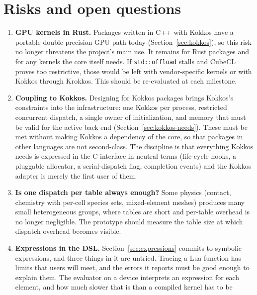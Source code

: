 \documentclass[11pt,a4paper]{article}
\newcommand{\code}[1]{\texttt{#1}}
\begin{document}
\section{Risks and open questions}
\label{sec:risks}

\begin{enumerate}
  \item \label{risk:gpu} \textbf{GPU kernels in Rust.}  Packages written in C++ with Kokkos
        have a portable double-precision GPU path today
        (Section~\ref{sec:kokkos}), so this risk no longer threatens the
        project's main use.  It remains for Rust packages and for any kernels
        the core itself needs.  If \code{std::offload} stalls and CubeCL
        proves too restrictive, those would be left with vendor-specific
        kernels or with Kokkos through Krokkos.  This should be re-evaluated
        at each milestone.
  \item \textbf{Coupling to Kokkos.}  Designing for Kokkos packages brings
        Kokkos's constraints into the infrastructure: one Kokkos per process,
        restricted concurrent dispatch, a single owner of initialization, and
        memory that must be valid for the active back end
        (Section~\ref{sec:kokkos-needs}).  These must be met without making
        Kokkos a dependency of the core, so that packages in other languages
        are not second-class.  The discipline is that everything Kokkos
        needs is expressed in the C interface in neutral terms (life-cycle
        hooks, a pluggable allocator, a serial-dispatch flag, completion
        events) and the Kokkos adapter is merely the first user of them.
  \item \label{risk:dispatch} \textbf{Is one dispatch per table always enough?}  Some physics
        (contact, chemistry with per-cell species sets, mixed-element meshes)
        produces many small heterogeneous groups, where tables are short and
        per-table overhead is no longer negligible.  The prototype should
        measure the table size at which dispatch overhead becomes visible.
  \item \textbf{Expressions in the DSL.}  Section~\ref{sec:expressions}
        commits to symbolic expressions, and three things in it are untried.
        Tracing a Lua function has limits that users will meet, and the
        errors it reports must be good enough to explain them.  The
        evaluator on a device interprets an expression for each element,
        and how much slower that is than a compiled kernel has to be

\end{enumerate}
\end{document}
